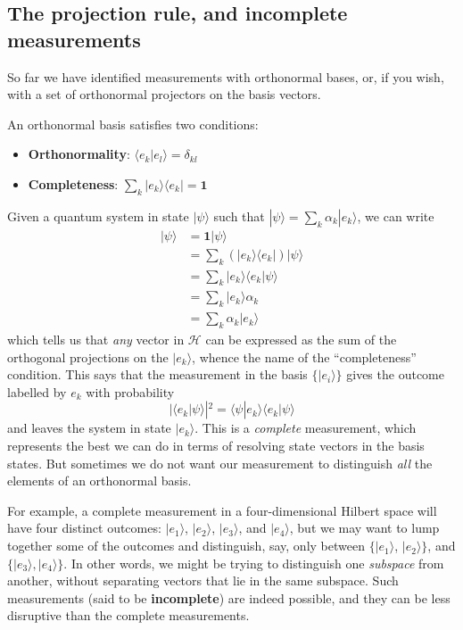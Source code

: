 \documentclass[fleqn,a4paper]{article}
\providecommand{\tightlist}{\setlength{\itemsep}{0pt}\setlength{\parskip}{0pt}}
\newenvironment{idea}{\everypar{\setlength{\parindent}{1.5em}}}{}
\theoremstyle{definition}
\theoremstyle{definition}
\theoremstyle{definition}
\theoremstyle{definition}
\theoremstyle{remark}
\begin{document}
\hypertarget{projection-rule-and-incomplete-measurements}{%
\subsection{The projection rule, and incomplete measurements}\label{projection-rule-and-incomplete-measurements}}

So far we have identified measurements with orthonormal bases, or, if you wish, with a set of orthonormal projectors on the basis vectors.

\begin{idea}

An orthonormal basis satisfies two conditions:

\begin{itemize}
\tightlist
\item
  \textbf{Orthonormality}: \(\langle e_k|e_l\rangle = \delta_{kl}\)
\item
  \textbf{Completeness}: \(\sum_k|e_k\rangle\langle e_k| = \mathbf{1}\)
\end{itemize}

\end{idea}

Given a quantum system in state \(|\psi\rangle\) such that \(|\psi\rangle = \sum_k \alpha_k|e_k\rangle\), we can write
\[
  \begin{aligned}
    |\psi\rangle
    &= \mathbf{1}|\psi\rangle
  \\&= \sum_k (|e_k\rangle\langle e_k|) |\psi\rangle
  \\&= \sum_k |e_k\rangle\langle e_k|\psi\rangle
  \\&= \sum_k |e_k\rangle\alpha_k
  \\&= \sum_k \alpha_k|e_k\rangle
  \end{aligned}
\]
which tells us that \emph{any} vector in \(\mathcal{H}\) can be expressed as the sum of the orthogonal projections on the \(|e_k\rangle\), whence the name of the ``completeness'' condition.
This says that the measurement in the basis \(\{|e_i\rangle\}\) gives the outcome labelled by \(e_k\) with probability
\[
  |\langle e_k|\psi\rangle|^2 = \langle\psi|e_k\rangle\langle e_k|\psi\rangle
\]
and leaves the system in state \(|e_k\rangle\).
This is a \emph{complete} measurement, which represents the best we can do in terms of resolving state vectors in the basis states.
But sometimes we do not want our measurement to distinguish \emph{all} the elements of an orthonormal basis.

For example, a complete measurement in a four-dimensional Hilbert space will have four distinct outcomes: \(|e_1\rangle\), \(|e_2\rangle\), \(|e_3\rangle\), and \(|e_4\rangle\), but we may want to lump together some of the outcomes and distinguish, say, only between \(\{|e_1\rangle\), \(|e_2\rangle\}\), and \(\{|e_3\rangle,|e_4\rangle\}\).
In other words, we might be trying to distinguish one \emph{subspace} from another, without separating vectors that lie in the same subspace.
Such measurements (said to be \textbf{incomplete}) are indeed possible, and they can be less disruptive than the complete measurements.
\end{document}
